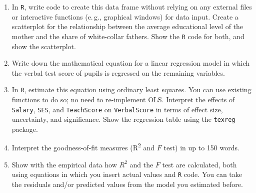 \documentclass[a4paper,11pt]{article}
\begin{document}
\begin{enumerate}
 \item In \texttt{R}, write code to create this data frame without relying on any external files or interactive functions (e.\,g., graphical windows) for data input. Create a scatterplot for the relationship between the average educational level of the mother and the share of white-collar fathers. Show the \texttt{R} code for both, and show the scatterplot.
 \item Write down the mathematical equation for a linear regression model in which the verbal test score of pupils is regressed on the remaining variables.
 \item In \texttt{R}, estimate this equation using ordinary least squares. You can use existing functions to do so; no need to re-implement OLS. Interpret the effects of \texttt{Salary}, \texttt{SES}, and \texttt{TeachScore} on \texttt{VerbalScore} in terms of effect size, uncertainty, and significance. Show the regression table using the \texttt{texreg} package.
 \item Interpret the goodness-of-fit measures (R\textsuperscript{2} and $F$ test) in up to 150 words.
 \item Show with the empirical data how $R^2$ and the $F$ test are calculated, both using equations in which you insert actual values and \texttt{R} code. You can take the residuals and/or predicted values from the model you estimated before.
\end{enumerate}
\end{document}
